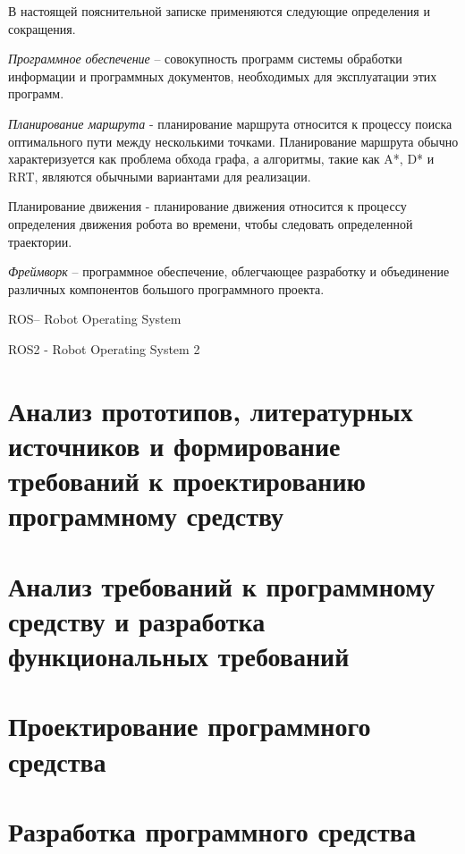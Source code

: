 



\newcommand{\appname}{ПСНМС} 
\newcommand{\ros}{ROS}


В настоящей пояснительной записке применяются следующие определения и
сокращения.

\textit{Программное обеспечение} -- совокупность программ системы обработки
информации и программных документов, необходимых для эксплуатации этих
программ.

\textit{Планирование маршрута} - планирование маршрута относится к процессу
поиска оптимального пути между несколькими точками. Планирование маршрута обычно
характеризуется как проблема обхода графа, а алгоритмы, такие как A*, D* и RRT,
являются обычными вариантами для реализации.

Планирование движения - планирование движения относится к процессу определения
движения робота во времени, чтобы следовать определенной траектории.

\textit{Фреймворк} -- программное обеспечение, облегчающее разработку и
объединение различных компонентов большого программного проекта.

\ros -- Robot Operating System

\ros2{} - Robot Operating System 2


\section{Анализ прототипов, литературных источников и формирование требований
к проектированию программному средству}


\section{Анализ требований к программному средству и разработка функциональных
требований}

\section{Проектирование программного средства}

\section{Разработка программного средства}


